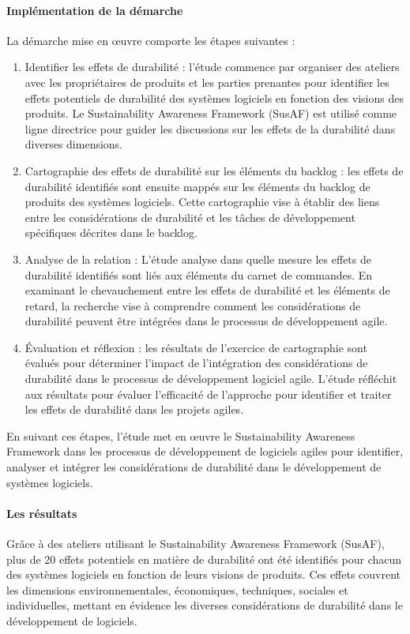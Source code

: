 \paragraph{Implémentation de la démarche}
La démarche mise en œuvre comporte les étapes suivantes :

\begin{enumerate}
    \item Identifier les effets de durabilité : l'étude commence par organiser des ateliers avec les propriétaires de produits et les parties prenantes pour identifier les effets potentiels de durabilité des systèmes logiciels en fonction des visions des produits. Le Sustainability Awareness Framework (SusAF) est utilisé comme ligne directrice pour guider les discussions sur les effets de la durabilité dans diverses dimensions.
    \item Cartographie des effets de durabilité sur les éléments du backlog : les effets de durabilité identifiés sont ensuite mappés sur les éléments du backlog de produits des systèmes logiciels. Cette cartographie vise à établir des liens entre les considérations de durabilité et les tâches de développement spécifiques décrites dans le backlog.
    \item Analyse de la relation : L'étude analyse dans quelle mesure les effets de durabilité identifiés sont liés aux éléments du carnet de commandes. En examinant le chevauchement entre les effets de durabilité et les éléments de retard, la recherche vise à comprendre comment les considérations de durabilité peuvent être intégrées dans le processus de développement agile.
    \item Évaluation et réflexion : les résultats de l'exercice de cartographie sont évalués pour déterminer l'impact de l'intégration des considérations de durabilité dans le processus de développement logiciel agile. L'étude réfléchit aux résultats pour évaluer l'efficacité de l'approche pour identifier et traiter les effets de durabilité dans les projets agiles.
\end{enumerate}

En suivant ces étapes, l'étude met en œuvre le Sustainability Awareness Framework dans les processus de développement de logiciels agiles pour identifier, analyser et intégrer les considérations de durabilité dans le développement de systèmes logiciels.

\paragraph{Les résultats}
Grâce à des ateliers utilisant le Sustainability Awareness Framework (SusAF), plus de 20 effets potentiels en matière de durabilité ont été identifiés pour chacun des systèmes logiciels en fonction de leurs visions de produits. Ces effets couvrent les dimensions environnementales, économiques, techniques, sociales et individuelles, mettant en évidence les diverses considérations de durabilité dans le développement de logiciels.

